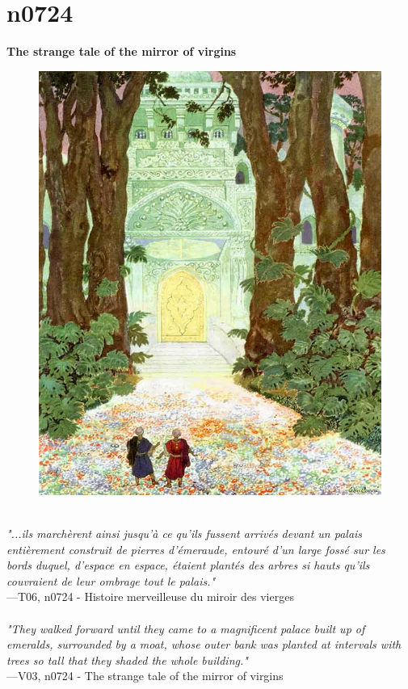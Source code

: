 \documentclass[../Carre_nights.tex]{subfiles}
\begin{document}
\newpage

\section{n0724}
\textbf{\Large{The strange tale of the mirror of virgins}} \\

\begin{figure}[ht]
\centering
\includegraphics[height=\figsize]{illustrations/volume_6/T06, n0724 - Histoire merveilleuse du miroir des vierges.jpg}
\end{figure}

\textit{\\
"...ils marchèrent ainsi jusqu’à ce qu’ils fussent arrivés devant un palais entièrement construit de pierres d’émeraude, entouré d’un large fossé sur les bords duquel, d’espace en espace, étaient plantés des arbres si hauts qu’ils couvraient de leur ombrage tout le palais."} \\
—T06, n0724 - Histoire merveilleuse du miroir des vierges \\~\\
\textit{"They walked forward until they came to a magnificent palace built up of emeralds, surrounded by a moat, whose outer bank was planted at intervals with trees so tall that they shaded the whole building."} \\
—V03, n0724 - The strange tale of the mirror of virgins
\end{document}
